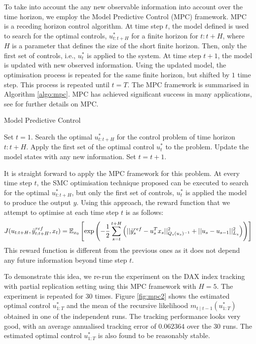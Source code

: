 To take into account the any new observable information into account over the time horizon, we employ the Model Predictive Control (MPC) framework. MPC is a receding horizon control algorithm. At time step $t$, the model defined is used to search for the optimal controls, $u^*_{t:t+H}$ for a finite horizon for $t:t+H$, where $H$ is a parameter that defines the size of the short finite horizon. Then, only the first set of controls, i.e., $u^*_{t}$ is applied to the system. At time step $t+1$, the model is updated with new observed information. Using the updated model, the optimisation process is repeated for the same finite horizon, but shifted by $1$ time step. This process is repeated until $t=T$. The MPC framework is summarised in Algorithm \ref{algo:mpc}.  MPC has achieved significant success in many applications, see \cite{RJB09,MJM02} for further details on MPC.

\begin{algorithm}
\caption{Model Predictive Control}\label{algo:mpc}
\begin{algorithmic}[1]
\State Set $t = 1$.
\State Search the optimal $u^*_{t:t+H}$ for the control problem of time horizon $t:t+H$.
\State Apply the first set of the optimal control  $u^*_{t}$ to the problem.
\State Update the model states with any new information.
\State Set $t = t + 1$.
\EndWhile
\EndFunction
\end{algorithmic}
\end{algorithm}

It is straight forward to apply the MPC framework for this problem. At every time step $t$, the SMC optimisation technique proposed can be executed to search for the optimal $u^*_{t:t+H}$, but only the first set of controls, $u^*_t$ is applied the model to produce the output $y$. Using this approach, the reward function that we attempt to optimise at each time step $t$ is as follows:
\begin{equation}
  J(u_{t:t+H},\tilde{y}^{ref}_{t:t+H}, x_t) = \operatorname{\mathbb{E}}_{x_0}\left[ \exp \left( -\dfrac{1}{2}\displaystyle\sum^{t+H}_{s=t}\left(\vert\vert \tilde{y}^{ref}_s - u^T_s x_s \vert\vert^2_{Q_s(u_s)^{-1}}  + \vert\vert u_s - u_{s-1} \vert\vert^2_{L_s}\right) \right ) \right]
\label{eq:J2}
\end{equation}
This reward function is different from the previous ones as it does not depend any future information beyond time step $t$.

To demonstrate this idea, we re-run the experiment on the DAX index tracking with partial replication setting using this MPC framework with $H=5$. The experiment is repeated for $30$ times. Figure \ref{fig:mpc2} shows the estimated optimal control $u^*_{1:T}$ and the mean of the recursive likelihood $m_{t \mid t-1}(u^*_{1:T})$ obtained in one of the independent runs. The tracking performance looks very good, with an average annualised tracking error of $0.062364$ over the $30$ runs. The estimated optimal control $u^*_{1:T}$ is also found to be reasonably stable.

